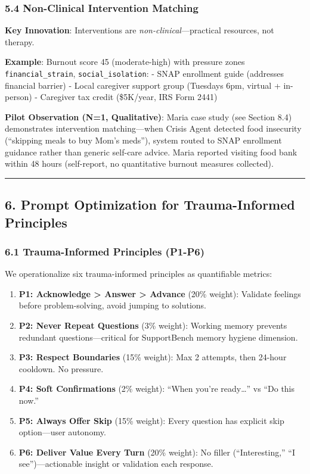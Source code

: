 \documentclass[
]{article}
\begin{document}
\subsubsection{5.4 Non-Clinical Intervention
Matching}\label{non-clinical-intervention-matching}

\textbf{Key Innovation}: Interventions are
\emph{non-clinical}---practical resources, not therapy.

\textbf{Example}: Burnout score 45 (moderate-high) with pressure zones
\texttt{financial\_strain}, \texttt{social\_isolation}: - SNAP
enrollment guide (addresses financial barrier) - Local caregiver support
group (Tuesdays 6pm, virtual + in-person) - Caregiver tax credit
(\$5K/year, IRS Form 2441)

\textbf{Pilot Observation (N=1, Qualitative)}: Maria case study (see
Section 8.4) demonstrates intervention matching---when Crisis Agent
detected food insecurity (``skipping meals to buy Mom's meds''), system
routed to SNAP enrollment guidance rather than generic self-care advice.
Maria reported visiting food bank within 48 hours (self-report, no
quantitative burnout measures collected).

\begin{center}\rule{0.5\linewidth}{0.5pt}\end{center}

\subsection{6. Prompt Optimization for Trauma-Informed
Principles}\label{prompt-optimization-for-trauma-informed-principles}

\subsubsection{6.1 Trauma-Informed Principles
(P1-P6)}\label{trauma-informed-principles-p1-p6}

We operationalize six trauma-informed principles as quantifiable
metrics:

\begin{enumerate}
\def\labelenumi{\arabic{enumi}.}
\item
  \textbf{P1: Acknowledge \textgreater{} Answer \textgreater{} Advance}
  (20\% weight): Validate feelings before problem-solving, avoid jumping
  to solutions.
\item
  \textbf{P2: Never Repeat Questions} (3\% weight): Working memory
  prevents redundant questions---critical for SupportBench memory
  hygiene dimension.
\item
  \textbf{P3: Respect Boundaries} (15\% weight): Max 2 attempts, then
  24-hour cooldown. No pressure.
\item
  \textbf{P4: Soft Confirmations} (2\% weight): ``When you're
  ready\ldots{}'' vs ``Do this now.''
\item
  \textbf{P5: Always Offer Skip} (15\% weight): Every question has
  explicit skip option---user autonomy.
\item
  \textbf{P6: Deliver Value Every Turn} (20\% weight): No filler
  (``Interesting,'' ``I see'')---actionable insight or validation each
  response.
\end{enumerate}
\end{document}
